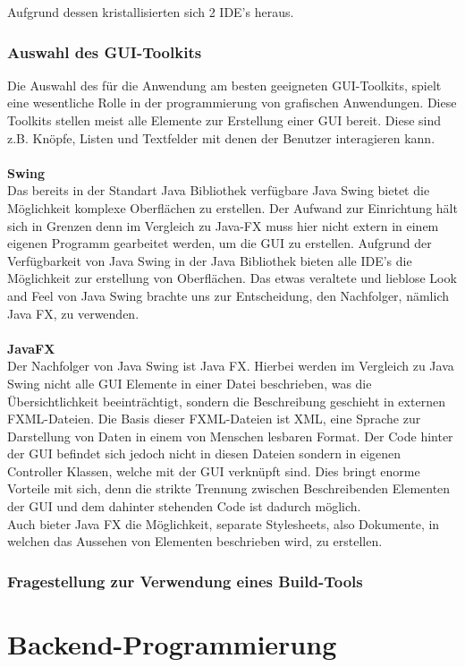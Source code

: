 Aufgrund dessen kristallisierten sich 2 IDE’s heraus.


\subsubsection{Auswahl des GUI-Toolkits}
Die Auswahl des für die Anwendung am besten geeigneten GUI-Toolkits, spielt eine wesentliche Rolle in der programmierung von grafischen Anwendungen.
Diese Toolkits stellen meist alle Elemente zur Erstellung einer GUI bereit.
Diese sind z.B. Knöpfe, Listen und Textfelder mit denen der Benutzer interagieren kann.
\\\\
\textbf{Swing}
\\
Das bereits in der Standart Java Bibliothek verfügbare Java Swing bietet die Möglichkeit komplexe Oberflächen zu erstellen.
Der Aufwand zur Einrichtung hält sich in Grenzen denn im Vergleich zu Java-FX muss hier nicht extern in einem eigenen Programm gearbeitet werden, um die GUI zu erstellen.
Aufgrund der Verfügbarkeit von Java Swing in der Java Bibliothek bieten alle IDE's die Möglichkeit zur erstellung von Oberflächen.
Das etwas veraltete und lieblose Look and Feel von Java Swing brachte uns zur Entscheidung, den Nachfolger, nämlich Java FX, zu verwenden.
\\\\
\textbf{JavaFX}
\\
Der Nachfolger von Java Swing ist Java FX. Hierbei werden im Vergleich zu Java Swing nicht alle GUI Elemente in einer Datei beschrieben, was die Übersichtlichkeit beeinträchtigt, sondern die Beschreibung geschieht in externen FXML-Dateien.
Die Basis dieser FXML-Dateien ist XML, eine Sprache zur Darstellung von Daten in einem von Menschen lesbaren Format.
Der Code hinter der GUI befindet sich jedoch nicht in diesen Dateien sondern in eigenen Controller Klassen, welche mit der GUI verknüpft sind.
Dies bringt enorme Vorteile mit sich, denn die strikte Trennung zwischen Beschreibenden Elementen der GUI
und dem dahinter stehenden Code ist dadurch möglich.\\
Auch bieter Java FX die Möglichkeit, separate Stylesheets, also Dokumente, in welchen das Aussehen von Elementen beschrieben wird, zu erstellen.

\subsubsection{Fragestellung zur Verwendung eines Build-Tools}
\section{Backend-Programmierung}

